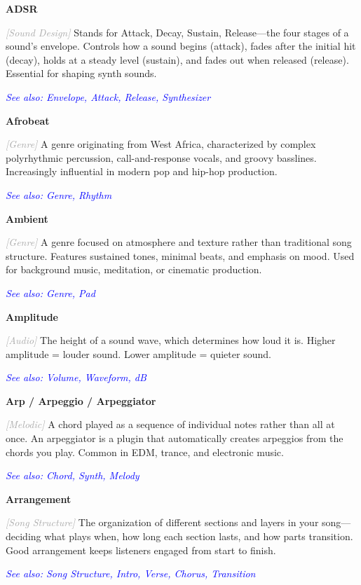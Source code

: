 \documentclass[11pt,letterpaper]{article}
\newcommand{\term}[1]{\textbf{\large\color{purple}#1}}
\newcommand{\category}[1]{\textcolor{darkgray}{\textit{\small [#1]}}}
\newcommand{\seealso}[1]{\textcolor{blue}{\textit{See also: #1}}}
\newenvironment{termdef}[1]
  {\noindent\term{#1}\par\nopagebreak}
  {\par\vspace{0.3em}}
\begin{document}
\begin{termdef}{ADSR}
\category{Sound Design}
Stands for Attack, Decay, Sustain, Release—the four stages of a sound's envelope. Controls how a sound begins (attack), fades after the initial hit (decay), holds at a steady level (sustain), and fades out when released (release). Essential for shaping synth sounds.

\seealso{Envelope, Attack, Release, Synthesizer}
\end{termdef}

\begin{termdef}{Afrobeat}
\category{Genre}
A genre originating from West Africa, characterized by complex polyrhythmic percussion, call-and-response vocals, and groovy basslines. Increasingly influential in modern pop and hip-hop production.

\seealso{Genre, Rhythm}
\end{termdef}

\begin{termdef}{Ambient}
\category{Genre}
A genre focused on atmosphere and texture rather than traditional song structure. Features sustained tones, minimal beats, and emphasis on mood. Used for background music, meditation, or cinematic production.

\seealso{Genre, Pad}
\end{termdef}

\begin{termdef}{Amplitude}
\category{Audio}
The height of a sound wave, which determines how loud it is. Higher amplitude = louder sound. Lower amplitude = quieter sound.

\seealso{Volume, Waveform, dB}
\end{termdef}

\begin{termdef}{Arp / Arpeggio / Arpeggiator}
\category{Melodic}
A chord played as a sequence of individual notes rather than all at once. An arpeggiator is a plugin that automatically creates arpeggios from the chords you play. Common in EDM, trance, and electronic music.

\seealso{Chord, Synth, Melody}
\end{termdef}

\begin{termdef}{Arrangement}
\category{Song Structure}
The organization of different sections and layers in your song—deciding what plays when, how long each section lasts, and how parts transition. Good arrangement keeps listeners engaged from start to finish.

\seealso{Song Structure, Intro, Verse, Chorus, Transition}
\end{termdef}
\end{document}
